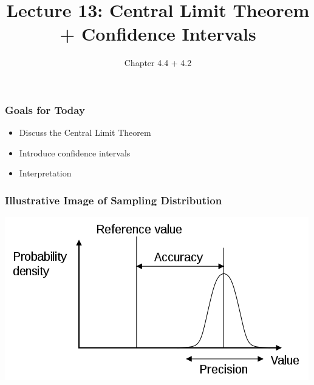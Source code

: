 \documentclass[handout]{beamer}
\title{Lecture 13: Central Limit Theorem + Confidence Intervals}
\author{Chapter 4.4 + 4.2}
\date{}
\begin{document}
\begin{frame}
\titlepage
\end{frame}


\begin{frame}[fragile]
\frametitle{Goals for Today}

\begin{itemize}
\item Discuss the Central Limit Theorem
\item Introduce confidence intervals
\item Interpretation
\end{itemize}

\end{frame}


\begin{frame}[fragile]
\frametitle{Illustrative Image of Sampling Distribution}

%
%
\begin{center}
\includegraphics[width=\textwidth]{figure/Accuracy_and_precision.png}
\end{center}

\end{frame}


\end{document}
